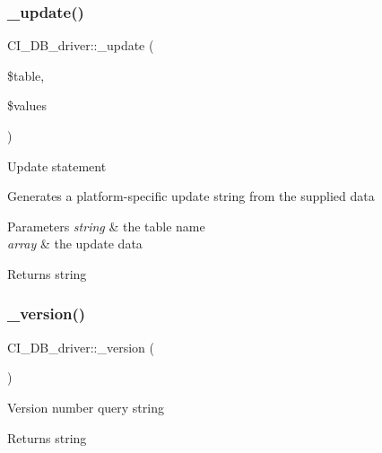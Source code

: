 \subsubsection{\texorpdfstring{\+\_\+update()}{\_update()}}
{\footnotesize\ttfamily C\+I\+\_\+\+D\+B\+\_\+driver\+::\+\_\+update (\begin{DoxyParamCaption}\item[{}]{\$table,  }\item[{}]{\$values }\end{DoxyParamCaption})\hspace{0.3cm}{\ttfamily [protected]}}

Update statement

Generates a platform-\/specific update string from the supplied data


\begin{DoxyParams}{Parameters}
{\em string} & the table name \\
\hline
{\em array} & the update data \\
\hline
\end{DoxyParams}
\begin{DoxyReturn}{Returns}
string 
\end{DoxyReturn}
\mbox{\label{class_c_i___d_b__driver_afa5e950c984fc92d2ddb7d53a51187c3}} 
\subsubsection{\texorpdfstring{\+\_\+version()}{\_version()}}
{\footnotesize\ttfamily C\+I\+\_\+\+D\+B\+\_\+driver\+::\+\_\+version (\begin{DoxyParamCaption}{ }\end{DoxyParamCaption})\hspace{0.3cm}{\ttfamily [protected]}}

Version number query string

\begin{DoxyReturn}{Returns}
string 
\end{DoxyReturn}
\mbox{\label{class_c_i___d_b__driver_a8e44d693a9ec55eb9279791deb25cff3}} 
